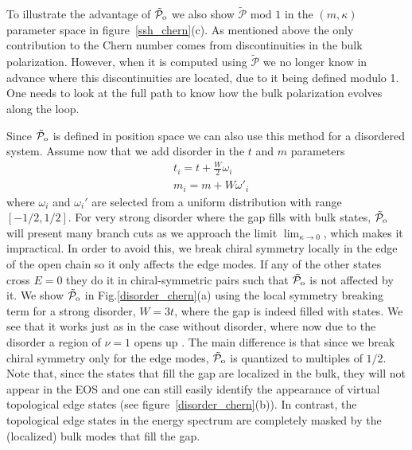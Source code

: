 \documentclass[twocolumn,amsmath,longbibliography,amssymb,superscriptaddress]{revtex4-1}
\newcommand{\tpo}{\tilde{\mathcal{P}}_{\rm o}}
\begin{document}
To illustrate the advantage of $\tpo$ we also show $\tilde{\mathcal{P}}$ mod $1$ in the $(m,\kappa)$ parameter space in figure~\ref{ssh_chern}(c). As mentioned above the only contribution to the Chern number comes from discontinuities in the bulk polarization.
However, when it is computed using $\tilde{\mathcal{P}}$ we no longer know in advance where this discontinuities are located, due to it being defined modulo 1. One needs to look at the full path to know how the bulk polarization evolves along the loop. 

Since $\tpo$ is defined in position space we can also use this method for a disordered system. Assume now that we add disorder in the $t$ and $m$ parameters
\begin{align}
&t_i = t + \frac{W}{2} \omega_i \nonumber\\
&m_i = m + W \omega'_i
\end{align}
where $\omega_i$ and $\omega_i'$ are selected from a uniform distribution with range $[-1/2,1/2]$. For very strong disorder where the gap fills with bulk states, $\tpo$ will present many branch cuts as we approach the limit $\lim_{\kappa \rightarrow 0}$, which makes it impractical. In order to avoid this, we break chiral symmetry locally in the edge of the open chain so it only affects the edge modes. If any of the other states cross $E=0$ they do it in  chiral-symmetric pairs such that $\tpo$ is not affected by it. We show $\tpo$ in Fig.\ref{disorder_chern}(a) using the local symmetry breaking term for a strong disorder, $W=3t$, where the gap is indeed filled with states. We see that it works just as in the case without disorder, where now due to the disorder a region of $\nu=1$ opens up \cite{Song2014}. The main difference is that since we break chiral symmetry only for the edge modes, $\tpo$ is quantized to multiples of $1/2$. Note that, since the states that fill the gap are localized in the bulk, they will not appear in the EOS and one can still easily identify the appearance of virtual topological edge states (see figure~\ref{disorder_chern}(b)).
In contrast, the topological edge states in the energy spectrum are completely masked by the (localized) bulk modes that fill the gap.
\end{document}
